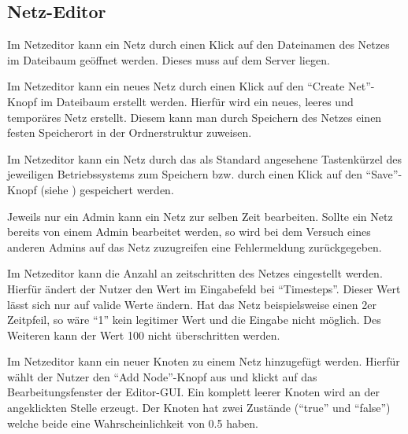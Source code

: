 \documentclass[parskip=full,11pt,twoside]{scrartcl}
\begin{document}
\subsection{Netz-Editor}

Im Netzeditor kann ein Netz durch einen Klick auf den Dateinamen des Netzes im Dateibaum geöffnet werden. Dieses muss auf dem Server liegen.

Im Netzeditor kann ein neues Netz durch einen Klick auf den \enquote{Create Net}-Knopf im Dateibaum erstellt werden. Hierfür wird ein neues, leeres und temporäres Netz erstellt. Diesem kann man durch Speichern des Netzes einen festen Speicherort in der Ordnerstruktur zuweisen.

Im Netzeditor kann ein Netz durch das als Standard angesehene Tastenkürzel des jeweiligen Betriebssystems zum Speichern bzw. durch einen Klick auf den \enquote{Save}-Knopf (siehe ) gespeichert werden.

Jeweils nur ein Admin kann ein Netz zur selben Zeit bearbeiten. Sollte ein Netz bereits von einem Admin bearbeitet werden, so wird bei dem Versuch eines anderen Admins auf das Netz zuzugreifen eine Fehlermeldung zurückgegeben.

Im Netzeditor kann die Anzahl an \gls{zeitschritte}n des Netzes eingestellt werden. Hierfür ändert der Nutzer den Wert im Eingabefeld bei \enquote{Timesteps}. Dieser Wert lässt sich nur auf valide Werte ändern. Hat das Netz beispielsweise einen 2er Zeitpfeil, so wäre \enquote{1} kein legitimer Wert und die Eingabe nicht möglich. Des Weiteren kann der Wert 100 nicht überschritten werden. 

Im Netzeditor kann ein neuer Knoten zu einem Netz hinzugefügt werden. Hierfür wählt der Nutzer den \enquote{Add Node}-Knopf aus und klickt auf das Bearbeitungsfenster der Editor-GUI. Ein komplett leerer Knoten wird an der angeklickten Stelle erzeugt.
Der Knoten hat zwei Zustände (\enquote{true} und \enquote{false}) welche beide eine Wahrscheinlichkeit von 0.5 haben.
\end{document}
